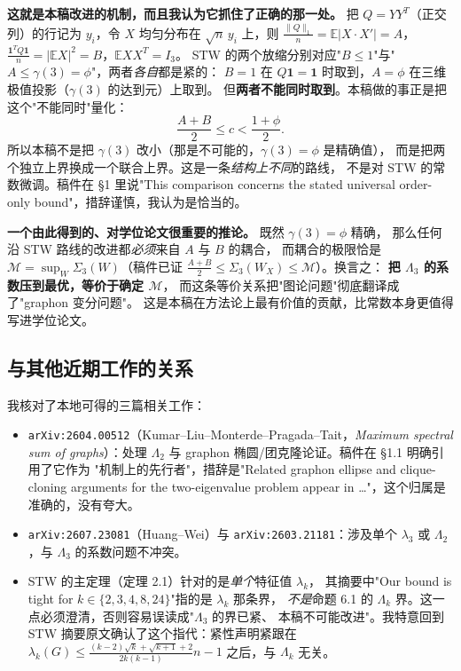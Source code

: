 \documentclass[UTF8,11pt]{ctexart}
\theoremstyle{definition}
\newcommand{\E}{\mathbb{E}}
\begin{document}
\textbf{这就是本稿改进的机制，而且我认为它抓住了正确的那一处。}
把 $Q=YY^T$（正交列）的行记为 $y_i$，令 $X$ 均匀分布在 $\sqrt n\,y_i$ 上，则
$\frac{\|Q\|_1}n=\E|X\cdot X'|=A$，$\frac{\mathbf1^TQ\mathbf1}n=|\E X|^2=B$，$\E XX^T=I_3$。
STW 的两个放缩分别对应"$B\le1$"与"$A\le\gamma(3)=\phi$"，两者\emph{各自}都是紧的：
$B=1$ 在 $Q\mathbf1=\mathbf1$ 时取到，$A=\phi$ 在三维极值投影（$\gamma(3)$ 的达到元）上取到。
但\textbf{两者不能同时取到}。本稿做的事正是把这个"不能同时"量化：
\[
 \frac{A+B}2\le c<\frac{1+\phi}2 .
\]
所以本稿不是把 $\gamma(3)$ 改小（那是不可能的，$\gamma(3)=\phi$ 是精确值），
而是把两个独立上界换成一个联合上界。这是一条\emph{结构上不同}的路线，
不是对 STW 的常数微调。稿件在 \S1 里说"This comparison concerns the stated universal
order-only bound"，措辞谨慎，我认为是恰当的。

\textbf{一个由此得到的、对学位论文很重要的推论。} 既然 $\gamma(3)=\phi$ 精确，
那么任何沿 STW 路线的改进都\emph{必须}来自 $A$ 与 $B$ 的耦合，
而耦合的极限恰是 $\mathcal M=\sup_W\Sigma_3(W)$（稿件已证
$\frac{A+B}2\le\Sigma_3(W_X)\le\mathcal M$）。换言之：
\textbf{把 $\Lambda_3$ 的系数压到最优，等价于确定 $\mathcal M$}，
而这条等价关系把"图论问题"彻底翻译成了"graphon 变分问题"。
这是本稿在方法论上最有价值的贡献，比常数本身更值得写进学位论文。

\subsection{与其他近期工作的关系}

我核对了本地可得的三篇相关工作：
\begin{itemize}[leftmargin=1.6em,itemsep=2pt]
\item \texttt{arXiv:2604.00512}（Kumar--Liu--Monterde--Pragada--Tait，\emph{Maximum spectral sum
of graphs}）：处理 $\Lambda_2$ 与 graphon 椭圆/团克隆论证。稿件在 \S1.1 明确引用了它作为
"机制上的先行者"，措辞是"Related graphon ellipse and clique-cloning arguments for the
two-eigenvalue problem appear in \dots"，这个归属是准确的，没有夸大。
\item \texttt{arXiv:2607.23081}（Huang--Wei）与 \texttt{arXiv:2603.21181}：涉及单个 $\lambda_3$
或 $\Lambda_2$，与 $\Lambda_3$ 的系数问题不冲突。
\item STW 的主定理（定理 2.1）针对的是\emph{单个}特征值 $\lambda_k$，
其摘要中"Our bound is tight for $k\in\{2,3,4,8,24\}$"指的是 $\lambda_k$ 那条界，
\emph{不是}命题 6.1 的 $\Lambda_k$ 界。这一点必须澄清，否则容易误读成"$\Lambda_3$ 的界已紧、
本稿不可能改进"。我特意回到 STW 摘要原文确认了这个指代：紧性声明紧跟在
$\lambda_k(G)\le\frac{(k-2)\sqrt k+\sqrt{k+1}+2}{2k(k-1)}n-1$ 之后，与 $\Lambda_k$ 无关。
\end{itemize}
\end{document}
